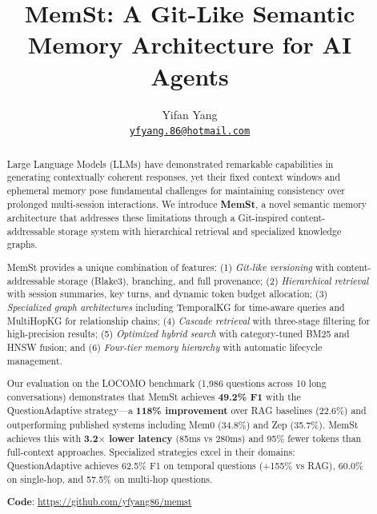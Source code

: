 \documentclass[11pt,letterpaper]{article}
\title{\centering \textbf{MemSt}: A Git-Like Semantic Memory Architecture for AI Agents}
\author{\centering Yifan Yang\\
\vspace{1em}
\hspace{0.6cm} \href{yfyang.86@hotmail.com}{\texttt{yfyang.86@hotmail.com}}}
\begin{document}
\maketitle

\begin{abstract}
\vspace{1cm}

Large Language Models (LLMs) have demonstrated remarkable capabilities in generating contextually coherent responses, yet their fixed context windows and ephemeral memory pose fundamental challenges for maintaining consistency over prolonged multi-session interactions. We introduce \textbf{MemSt}, a novel semantic memory architecture that addresses these limitations through a Git-inspired content-addressable storage system with hierarchical retrieval and specialized knowledge graphs.

MemSt provides a unique combination of features: (1) \textit{Git-like versioning} with content-addressable storage (Blake3), branching, and full provenance; (2) \textit{Hierarchical retrieval} with session summaries, key turns, and dynamic token budget allocation; (3) \textit{Specialized graph architectures} including TemporalKG for time-aware queries and MultiHopKG for relationship chains; (4) \textit{Cascade retrieval} with three-stage filtering for high-precision results; (5) \textit{Optimized hybrid search} with category-tuned BM25 and HNSW fusion; and (6) \textit{Four-tier memory hierarchy} with automatic lifecycle management.

Our evaluation on the LOCOMO benchmark (1,986 questions across 10 long conversations) demonstrates that MemSt achieves \textbf{49.2\% F1} with the QuestionAdaptive strategy---a \textbf{118\% improvement} over RAG baselines (22.6\%) and outperforming published systems including Mem0 (34.8\%) and Zep (35.7\%). MemSt achieves this with \textbf{3.2$\times$ lower latency} (85ms vs 280ms) and 95\% fewer tokens than full-context approaches. Specialized strategies excel in their domains: QuestionAdaptive achieves 62.5\% F1 on temporal questions (+155\% vs RAG), 60.0\% on single-hop, and 57.5\% on multi-hop questions.

\vspace{5mm}
\textbf{Code}: \href{https://github.com/yfyang86/memst}{https://github.com/yfyang86/memst}

\end{abstract}










\end{document}
